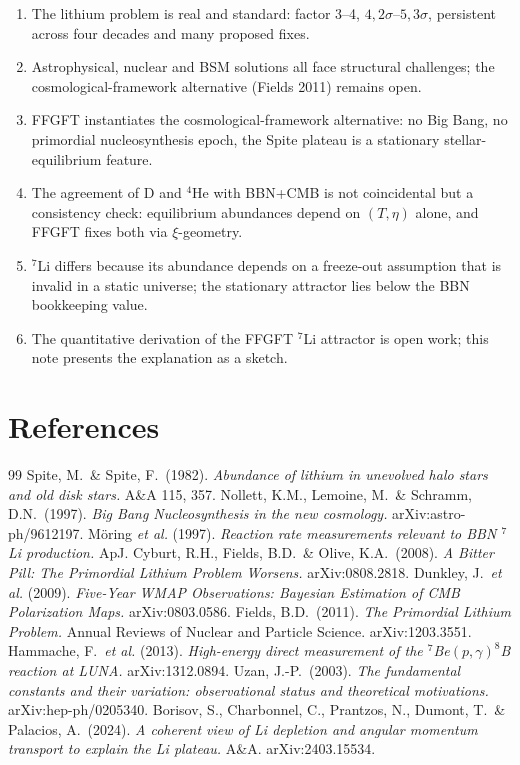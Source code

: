 \documentclass[11pt,a4paper]{article}
\begin{document}
\begin{enumerate}\itemsep2pt
\item The lithium problem is real and standard: factor 3--4, $4{,}2\sigma$--$5{,}3\sigma$, persistent across four decades and many proposed fixes.
\item Astrophysical, nuclear and BSM solutions all face structural challenges; the cosmological-framework alternative (Fields 2011) remains open.
\item FFGFT instantiates the cosmological-framework alternative: no Big Bang, no primordial nucleosynthesis epoch, the Spite plateau is a stationary stellar-equilibrium feature.
\item The agreement of D and $^4$He with BBN+CMB is not coincidental but a consistency check: equilibrium abundances depend on $(T, \eta)$ alone, and FFGFT fixes both via $\xi$-geometry.
\item $^7$Li differs because its abundance depends on a freeze-out assumption that is invalid in a static universe; the stationary attractor lies below the BBN bookkeeping value.
\item The quantitative derivation of the FFGFT $^7$Li attractor is open work; this note presents the explanation as a sketch.
\end{enumerate}

\section*{References}

\noindent\small
\begin{thebibliography}{99}
 Spite, M.\ \& Spite, F.\ (1982). \emph{Abundance of lithium in unevolved halo stars and old disk stars.} A\&A 115, 357.
 Nollett, K.M., Lemoine, M.\ \& Schramm, D.N.\ (1997). \emph{Big Bang Nucleosynthesis in the new cosmology.} arXiv:astro-ph/9612197.
 Möring \emph{et al.} (1997). \emph{Reaction rate measurements relevant to BBN $^7$Li production.} ApJ.
 Cyburt, R.H., Fields, B.D.\ \& Olive, K.A.\ (2008). \emph{A Bitter Pill: The Primordial Lithium Problem Worsens.} arXiv:0808.2818.
 Dunkley, J.\ \emph{et al.} (2009). \emph{Five-Year WMAP Observations: Bayesian Estimation of CMB Polarization Maps.} arXiv:0803.0586.
 Fields, B.D.\ (2011). \emph{The Primordial Lithium Problem.} Annual Reviews of Nuclear and Particle Science. arXiv:1203.3551.
 Hammache, F.\ \emph{et al.} (2013). \emph{High-energy direct measurement of the $^7$Be$(p,\gamma)^8$B reaction at LUNA.} arXiv:1312.0894.
 Uzan, J.-P.\ (2003). \emph{The fundamental constants and their variation: observational status and theoretical motivations.} arXiv:hep-ph/0205340.
 Borisov, S., Charbonnel, C., Prantzos, N., Dumont, T.\ \& Palacios, A.\ (2024). \emph{A coherent view of Li depletion and angular momentum transport to explain the Li plateau.} A\&A. arXiv:2403.15534.
\end{thebibliography}
\end{document}

